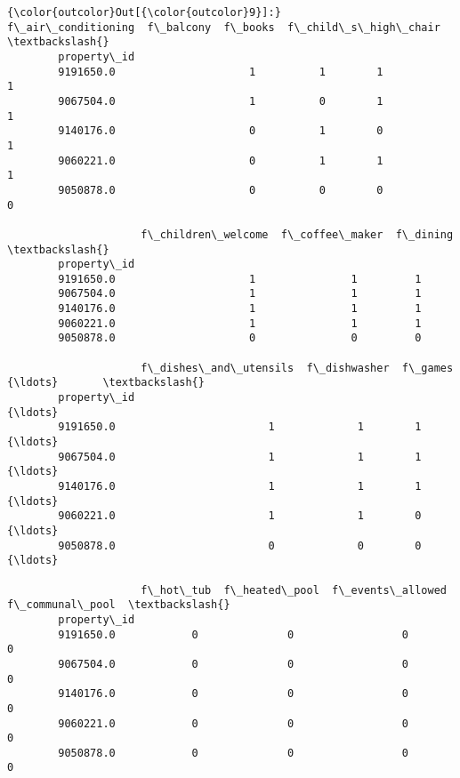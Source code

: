 \documentclass[11pt]{article}
\begin{document}
\begin{Verbatim}[commandchars=\\\{\}]
{\color{outcolor}Out[{\color{outcolor}9}]:}              f\_air\_conditioning  f\_balcony  f\_books  f\_child\_s\_high\_chair  \textbackslash{}
        property\_id                                                                 
        9191650.0                     1          1        1                     1   
        9067504.0                     1          0        1                     1   
        9140176.0                     0          1        0                     1   
        9060221.0                     0          1        1                     1   
        9050878.0                     0          0        0                     0   
        
                     f\_children\_welcome  f\_coffee\_maker  f\_dining  \textbackslash{}
        property\_id                                                 
        9191650.0                     1               1         1   
        9067504.0                     1               1         1   
        9140176.0                     1               1         1   
        9060221.0                     1               1         1   
        9050878.0                     0               0         0   
        
                     f\_dishes\_and\_utensils  f\_dishwasher  f\_games     {\ldots}       \textbackslash{}
        property\_id                                                   {\ldots}        
        9191650.0                        1             1        1     {\ldots}        
        9067504.0                        1             1        1     {\ldots}        
        9140176.0                        1             1        1     {\ldots}        
        9060221.0                        1             1        0     {\ldots}        
        9050878.0                        0             0        0     {\ldots}        
        
                     f\_hot\_tub  f\_heated\_pool  f\_events\_allowed  f\_communal\_pool  \textbackslash{}
        property\_id                                                                
        9191650.0            0              0                 0                0   
        9067504.0            0              0                 0                0   
        9140176.0            0              0                 0                0   
        9060221.0            0              0                 0                0   
        9050878.0            0              0                 0                0   
        

\end{Verbatim}
\end{document}
